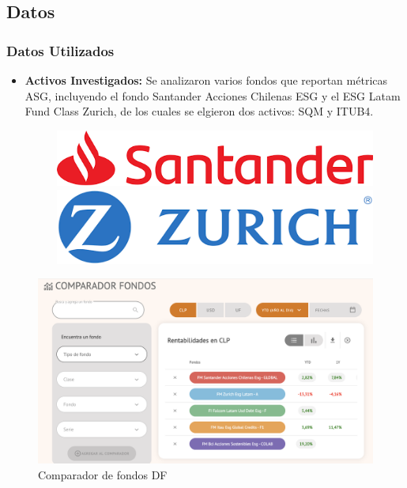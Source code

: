 \documentclass{beamer}
\begin{document}
\subsection{Datos}
\begin{frame}
    \frametitle{Datos Utilizados}
    \begin{itemize}
        \item \textbf{Activos Investigados:} Se analizaron varios fondos que reportan métricas ASG, incluyendo el fondo Santander Acciones Chilenas ESG y el ESG Latam Fund Class Zurich, de los cuales se elgieron dos activos: SQM y ITUB4.
        \begin{figure}[h!]
    \centering
    \begin{minipage}{0.45\linewidth}
        \centering
        \includegraphics[width=\linewidth]{Latex/defensa/logo_santander.png}
    \end{minipage}
    \hspace{0.05\linewidth}
    \begin{minipage}{0.45\linewidth}
        \centering
        \includegraphics[width=\linewidth]{Latex/defensa/logo_zurich.png}
    \end{minipage}
\end{figure}   
    \end{itemize}
    \begin{figure}
        \centering
        \includegraphics[width=0.5\linewidth]{Latex/defensa/comparador_fondos.png}
        \caption{Comparador de fondos DF}
    \end{figure}
\end{frame}
\end{document}
